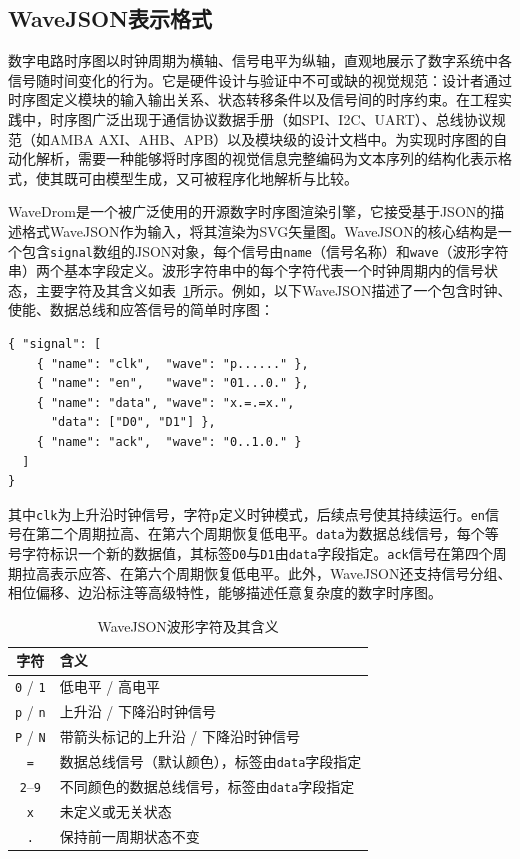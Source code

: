 \subsection{WaveJSON表示格式}

数字电路时序图以时钟周期为横轴、信号电平为纵轴，直观地展示了数字系统中各信号随时间变化的行为。它是硬件设计与验证中不可或缺的视觉规范：设计者通过时序图定义模块的输入输出关系、状态转移条件以及信号间的时序约束。在工程实践中，时序图广泛出现于通信协议数据手册（如SPI、I2C、UART）、总线协议规范（如AMBA AXI、AHB、APB）以及模块级的设计文档中。为实现时序图的自动化解析，需要一种能够将时序图的视觉信息完整编码为文本序列的结构化表示格式，使其既可由模型生成，又可被程序化地解析与比较。

WaveDrom是一个被广泛使用的开源数字时序图渲染引擎，它接受基于JSON的描述格式WaveJSON作为输入，将其渲染为SVG矢量图。WaveJSON的核心结构是一个包含\texttt{signal}数组的JSON对象，每个信号由\texttt{name}（信号名称）和\texttt{wave}（波形字符串）两个基本字段定义。波形字符串中的每个字符代表一个时钟周期内的信号状态，主要字符及其含义如表~\ref{tab:wavedrom-chars}所示。例如，以下WaveJSON描述了一个包含时钟、使能、数据总线和应答信号的简单时序图：
\begin{verbatim}
{ "signal": [
    { "name": "clk",  "wave": "p......" },
    { "name": "en",   "wave": "01...0." },
    { "name": "data", "wave": "x.=.=x.",
      "data": ["D0", "D1"] },
    { "name": "ack",  "wave": "0..1.0." }
  ]
}
\end{verbatim}
其中\texttt{clk}为上升沿时钟信号，字符\texttt{p}定义时钟模式，后续点号使其持续运行。\texttt{en}信号在第二个周期拉高、在第六个周期恢复低电平。\texttt{data}为数据总线信号，每个等号字符标识一个新的数据值，其标签\texttt{D0}与\texttt{D1}由\texttt{data}字段指定。\texttt{ack}信号在第四个周期拉高表示应答、在第六个周期恢复低电平。此外，WaveJSON还支持信号分组、相位偏移、边沿标注等高级特性，能够描述任意复杂度的数字时序图。

\begin{table}[htbp]
  \centering
  \caption{WaveJSON波形字符及其含义}
  \label{tab:wavedrom-chars}
  \begin{tabular}{cl}
    \toprule
    字符 & 含义 \\
    \midrule
    \texttt{0} / \texttt{1} & 低电平 / 高电平 \\
    \texttt{p} / \texttt{n} & 上升沿 / 下降沿时钟信号 \\
    \texttt{P} / \texttt{N} & 带箭头标记的上升沿 / 下降沿时钟信号 \\
    \texttt{=} & 数据总线信号（默认颜色），标签由\texttt{data}字段指定 \\
    \texttt{2}--\texttt{9} & 不同颜色的数据总线信号，标签由\texttt{data}字段指定 \\
    \texttt{x} & 未定义或无关状态 \\
    \texttt{.} & 保持前一周期状态不变 \\
    \bottomrule
  \end{tabular}
\end{table}

